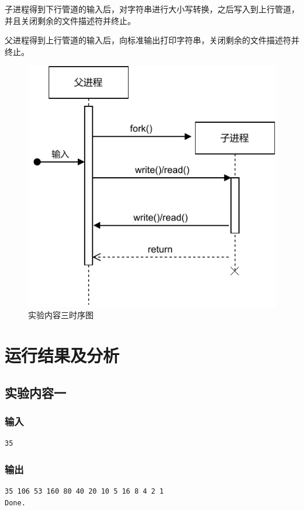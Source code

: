 \documentclass[lang=cn,11pt,a4paper,cite=authornum]{paper}
\begin{document}
子进程得到下行管道的输入后，对字符串进行大小写转换，之后写入到上行管道，并且关闭剩余的文件描述符并终止。

父进程得到上行管道的输入后，向标准输出打印字符串，关闭剩余的文件描述符并终止。

\begin{figure}[htbp]

    \centering
    \includegraphics[width=0.6\linewidth]{./images/UML2.pdf}
    \caption{实验内容三时序图\label{fig:UML2}}

\end{figure}

\section{运行结果及分析}

\subsection{实验内容一}

\subsubsection{输入}

\begin{code}
\begin{verbatim}
35
\end{verbatim}
\end{code}

\subsubsection{输出}

\begin{code}
\begin{verbatim}
35 106 53 160 80 40 20 10 5 16 8 4 2 1
Done.
\end{verbatim}
\end{code}
\end{document}
